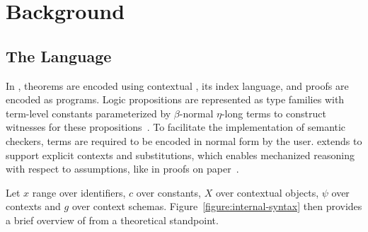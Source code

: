 \chapter{Background}

\section{The \Beluga Language}

In \Beluga, theorems are encoded using contextual \LF, its index language, and proofs are encoded as programs.
Logic propositions are represented as \LF type families with term-level constants parameterized by $\beta$-normal $\eta$-long \LF terms to construct witnesses for these propositions~\cite{nanevski2008contextual, foundation2008pientka, DBLP:journals/corr/abs-1009-2789}.
To facilitate the implementation of semantic checkers, \LF terms are required to be encoded in normal form by the user.
\Beluga extends \LF to support explicit contexts and substitutions, which enables mechanized reasoning with respect to assumptions, like in proofs on paper~\cite{pientka2010programming}.


Let $x$ range over identifiers, $c$ over constants, $X$ over contextual objects, $\psi$ over contexts and $g$ over context schemas.
Figure~\ref{figure:internal-syntax} then provides a brief overview of \Beluga from a theoretical standpoint.

